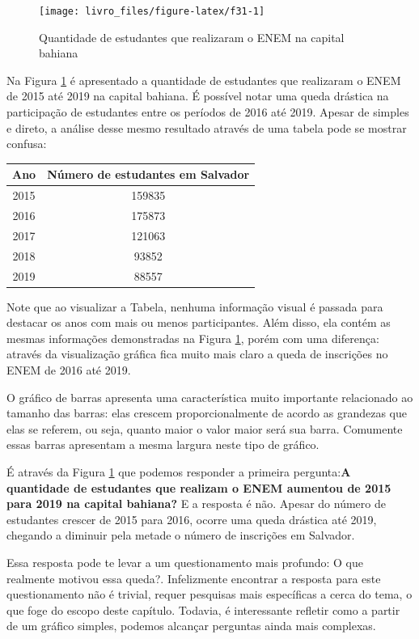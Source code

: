 \documentclass[
]{book}
\begin{document}
\begin{figure}

{\centering \texttt{[image: livro\_files/figure-latex/f31-1]} 

}

\caption{Quantidade de estudantes que realizaram o ENEM na capital bahiana}\label{fig:f31}
\end{figure}

Na Figura \ref{fig:f31} é apresentado a quantidade de estudantes que realizaram o ENEM de 2015 até 2019 na capital bahiana. É possível notar uma queda drástica na participação de estudantes entre os períodos de 2016 até 2019. Apesar de simples e direto, a análise desse mesmo resultado através de uma tabela pode se mostrar confusa:

\begin{longtable}[]{@{}cc@{}}
\toprule
Ano & Número de estudantes em Salvador\tabularnewline
\midrule
\endhead
2015 & 159835\tabularnewline
2016 & 175873\tabularnewline
2017 & 121063\tabularnewline
2018 & 93852\tabularnewline
2019 & 88557\tabularnewline
\bottomrule
\end{longtable}

Note que ao visualizar a Tabela, nenhuma informação visual é passada para destacar os anos com mais ou menos participantes. Além disso, ela contém as mesmas informações demonstradas na Figura \ref{fig:f31}, porém com uma diferença: através da visualização gráfica fica muito mais claro a queda de inscrições no ENEM de 2016 até 2019.

O gráfico de barras apresenta uma característica muito importante relacionado ao tamanho das barras: elas crescem proporcionalmente de acordo as grandezas que elas se referem, ou seja, quanto maior o valor maior será sua barra. Comumente essas barras apresentam a mesma largura neste tipo de gráfico.

É através da Figura \ref{fig:f31} que podemos responder a primeira pergunta:\textbf{A quantidade de estudantes que realizam o ENEM aumentou de 2015 para 2019 na capital bahiana?} E a resposta é não. Apesar do número de estudantes crescer de 2015 para 2016, ocorre uma queda drástica até 2019, chegando a diminuir pela metade o número de inscrições em Salvador.

Essa resposta pode te levar a um questionamento mais profundo: O que realmente motivou essa queda?. Infelizmente encontrar a resposta para este questionamento não é trivial, requer pesquisas mais específicas a cerca do tema, o que foge do escopo deste capítulo. Todavia, é interessante refletir como a partir de um gráfico simples, podemos alcançar perguntas ainda mais complexas.
\end{document}
